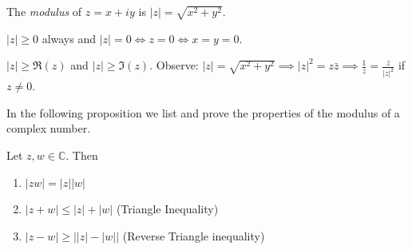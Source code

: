 \begin{definition}
The \emph{modulus} of $z = x + iy$ is $\lvert z\rvert = \sqrt{x^2 + y^2}$.
\end{definition}
\begin{remark}
$\lvert z\rvert \ge 0$ always and $\lvert z\rvert = 0 \iff z = 0 \iff x = y = 0$.
\end{remark}

 $\lvert z\rvert\ge \Re(z)$ and $\lvert z\rvert \ge \Im(z)$.
Observe: $\lvert z\rvert = \sqrt{x^2+y^2} \implies \lvert z\rvert^2 = z\bar{z} \implies \frac{1}{z} = \frac{\bar{z}}{\lvert z\rvert^2}$ if $z\neq 0$.

In the following proposition we list and prove the properties of the modulus of a complex number.
\begin{proposition}\label{proposition:1.2}
Let $z,w \in \mathbb{C}$. Then
\begin{enumerate}
    \item $\lvert zw\rvert = \lvert z\rvert  \lvert w   \rvert $
    \item $\lvert z+w\rvert \le \lvert z\rvert + \lvert w \rvert $ \hfill (Triangle Inequality)
    \item $\lvert z-w\rvert \ge\lvert \lvert z\rvert -  \lvert w   \rvert \rvert $ \hfill (Reverse Triangle inequality)
\end{enumerate}
\end{proposition}

